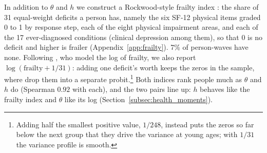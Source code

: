 \documentclass[11pt]{article}
\begin{document}
	
	In addition to $\theta$ and $h$ we construct a Rockwood-style frailty index \citep{mitnitski2001,searle2008}: the share of 31 equal-weight deficits a person has, namely the six SF-12 physical items graded 0 to 1 by response step, each of the eight physical impairment areas, and each of the 17 ever-diagnosed conditions (clinical depression among them), so that 0 is no deficit and higher is frailer (Appendix~\ref{app:frailty}). 7\% of person-waves have none. Following \citet{hosseini2022}, who model the log of frailty, we also report $\log(\text{frailty}+1/31)$: adding one deficit's worth keeps the zeros in the sample, where \citet{hosseini2022} drop them into a separate probit.\footnote{Adding half the smallest positive value, $1/248$, instead puts the zeros so far below the next group that they drive the variance at young ages; with $1/31$ the variance profile is smooth.} Both indices rank people much as $\theta$ and $h$ do (Spearman $0.92$ with each), and the two pairs line up: $h$ behaves like the frailty index and $\theta$ like its log (Section~\ref{subsec:health_moments}).
	
\end{document}
